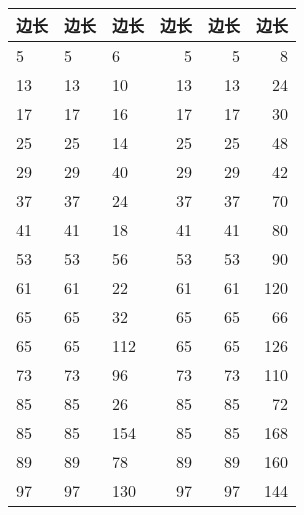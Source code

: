 \documentclass[12pt]{article}
\begin{document}
\begin{table}[H]
\centering
{}
\begin{tabular}{lllrrr}
\toprule
    边长&边长&边长&边长&边长&边长\\
\midrule
    5  & 5  & 6   & 5  & 5  & 8 \\
    13 & 13 & 10  & 13 & 13 & 24 \\
    17 & 17 & 16  & 17 & 17 & 30 \\
    25 & 25 & 14  & 25 & 25 & 48 \\
    29 & 29 & 40  & 29 & 29 & 42 \\
    37 & 37 & 24  & 37 & 37 & 70 \\
    41 & 41 & 18  & 41 & 41 & 80 \\
    53 & 53 & 56  & 53 & 53 & 90 \\
    61 & 61 & 22  & 61 & 61 & 120 \\
    65 & 65 & 32  & 65 & 65 & 66 \\
    65 & 65 & 112 & 65 & 65 & 126 \\
    73 & 73 & 96  & 73 & 73 & 110 \\
    85 & 85 & 26  & 85 & 85 & 72 \\
    85 & 85 & 154 & 85 & 85 & 168 \\
    89 & 89 & 78  & 89 & 89 & 160 \\
    97 & 97 & 130 & 97 & 97 & 144 \\
\bottomrule
\end{tabular}%
\end{table}%
\end{document}
